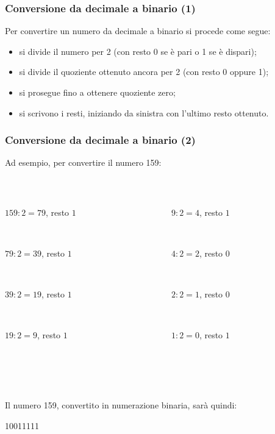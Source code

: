 \documentclass[handout]{beamer}
\begin{document}
\begin{frame}
\frametitle{Conversione da decimale a binario (1)}
Per convertire un numero da decimale a binario si procede come segue:
\begin{itemize}
  \item si divide il numero per 2 (con resto 0 se è pari o 1 se è dispari);\pause
  \item si divide il quoziente ottenuto ancora per 2 (con resto 0 oppure 1);\pause
  \item si prosegue fino a ottenere quoziente zero;\pause
  \item si scrivono i resti, iniziando da sinistra con l'ultimo resto ottenuto.
\end{itemize}
\end{frame}

\begin{frame}
\frametitle{Conversione da decimale a binario (2)}
Ad esempio, per convertire il numero 159:

~

\begin{columns}
  \begin{column}{0.4\textwidth}
    $ 159 : 2 = 79 $, resto \alert<16>{$ 1 $}\pause

    ~

    $ 79 : 2 = 39 $, resto \alert<15>{$ 1 $}\pause

    ~

    $ 39 : 2 = 19 $, resto \alert<14>{$ 1 $}\pause


    ~

    $ 19 : 2 = 9 $, resto \alert<13>{$ 1 $}\pause
  \end{column}
  \begin{column}{0.4\textwidth}
    $ 9 : 2 = 4 $, resto \alert<12>{$ 1 $}\pause

    ~

    $ 4 : 2 = 2 $, resto \alert<11>{$ 0 $}\pause

    ~

    $ 2 : 2 = 1 $, resto \alert<10>{$ 0 $}\pause


    ~

    $ 1 : 2 = 0 $, resto \alert<9>{$ 1 $}\pause
  \end{column}
\end{columns}

~

~

Il numero 159, convertito in numerazione binaria, sarà quindi:
\begin{center}
  \alert<9>{1}\pause\alert<10>{0}\pause\alert<11>{0}\pause\alert<12>{1}\pause\alert<13>{1}\pause\alert<14>{1}\pause\alert<15>{1}\pause\alert<16>{1}
\end{center}
\end{frame}
\end{document}
